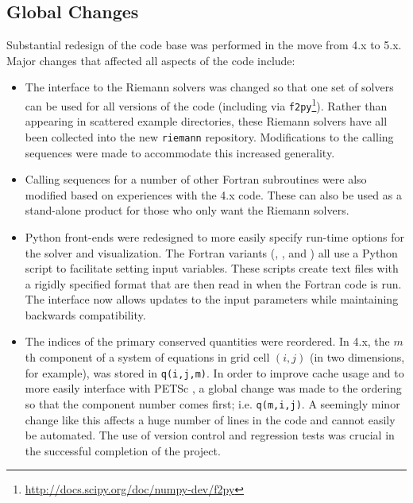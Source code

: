 %
%
%

\subsection{Global Changes}
Substantial redesign of the \clawpack code base was performed in the move
from \clawpack 4.x to 5.x.
Major changes that affected all aspects of the code include:
\begin{itemize}
    \item The interface to the \clawpack Riemann solvers was changed so that one
    set of solvers can be used for all versions of the code (including \pyclaw
    via
    \texttt{f2py}\footnote{\url{http://docs.scipy.org/doc/numpy-dev/f2py}}).
    Rather than appearing in scattered example directories,
    these Riemann solvers have all been collected into the new
    \texttt{riemann} repository. Modifications to the
    calling sequences were made to accommodate this increased generality.
    \item Calling sequences for a number of other Fortran subroutines were also
    modified based on experiences with the \clawpack 4.x code.  These can also
    be used as a stand-alone product for those who only want the Riemann
    solvers.
    \item Python front-ends were redesigned to more easily
    specify run-time options for
    the solver and visualization.  The Fortran variants (\classic, \amrclaw, and
    \geoclaw) all use a Python script to facilitate setting input variables.
    These scripts create text files with a rigidly specified format that are then read
    in when the Fortran code is run. The interface now allows updates to the
    input parameters while maintaining backwards compatibility.
    \item The indices of the primary conserved quantities were reordered.  In
    \clawpack 4.x, the $m$th component of a
    system of equations in grid cell $(i,j)$ (in two dimensions, for example),
    was stored in \texttt{q(i,j,m)}.  In order to improve cache usage and to
    more easily interface with PETSc , a global
    change was made to the ordering so that the component number comes
    first; i.e. \texttt{q(m,i,j)}.  A seemingly minor change like this affects a
    huge number of lines in the code and cannot easily be automated. The use of
    version control and regression tests was crucial in the successful
    completion of the project. 
\end{itemize}
